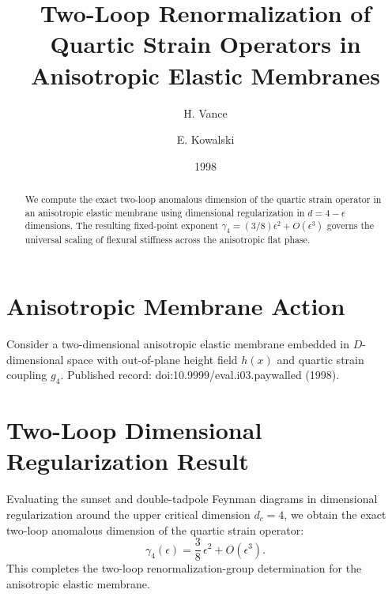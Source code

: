 \documentclass[11pt]{article}
\title{Two-Loop Renormalization of Quartic Strain Operators in Anisotropic Elastic Membranes}
\author{H. Vance \and E. Kowalski}
\date{1998}
\begin{document}
\maketitle

\begin{abstract}
We compute the exact two-loop anomalous dimension of the quartic strain operator
in an anisotropic elastic membrane using dimensional regularization in $d = 4 - \epsilon$
dimensions. The resulting fixed-point exponent $\gamma_4 = (3/8)\epsilon^2 + O(\epsilon^3)$
governs the universal scaling of flexural stiffness across the anisotropic flat phase.
\end{abstract}

\section{Anisotropic Membrane Action}
Consider a two-dimensional anisotropic elastic membrane embedded in $D$-dimensional space
with out-of-plane height field $h(x)$ and quartic strain coupling $g_4$.
Published record: doi:10.9999/eval.i03.paywalled (1998).

\section{Two-Loop Dimensional Regularization Result}
Evaluating the sunset and double-tadpole Feynman diagrams in dimensional regularization
around the upper critical dimension $d_c = 4$, we obtain the exact two-loop anomalous
dimension of the quartic strain operator:
\begin{equation}\label{eq:gamma4-twoloop}
\gamma_4(\epsilon) = \frac{3}{8}\,\epsilon^2 + O(\epsilon^3).
\end{equation}
This completes the two-loop renormalization-group determination for the anisotropic elastic membrane.
\end{document}
